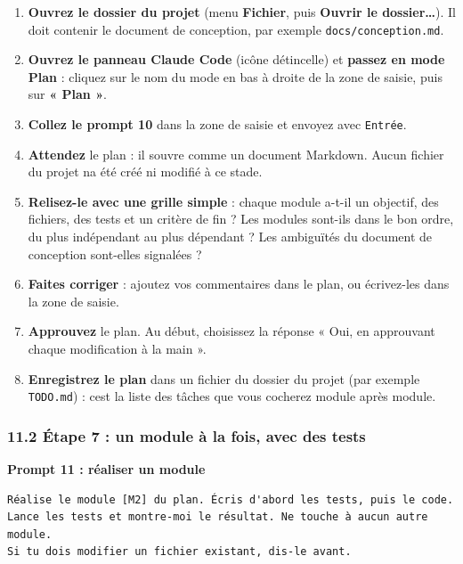 \documentclass[
  french,
  11pt,
  a4paper,
]{article}
\providecommand{\tightlist}{%
  \setlength{\itemsep}{0pt}\setlength{\parskip}{0pt}}
\begin{document}
\begin{enumerate}
\def\labelenumi{\arabic{enumi}.}
\tightlist
\item
  \textbf{Ouvrez le dossier du projet} (menu \textbf{Fichier}, puis
  \textbf{Ouvrir le dossier\ldots{}}). Il doit contenir le document de
  conception, par exemple
  \texttt{docs/\allowbreak{}conception.\allowbreak{}md}.
\item
  \textbf{Ouvrez le panneau Claude Code} (icône
  d\textquotesingle étincelle) et \textbf{passez en mode Plan} : cliquez
  sur le nom du mode en bas à droite de la zone de saisie, puis sur
  \textbf{« Plan »}.
\item
  \textbf{Collez le prompt 10} dans la zone de saisie et envoyez avec
  \texttt{Entrée}.
\item
  \textbf{Attendez} le plan : il s\textquotesingle ouvre comme un
  document Markdown. Aucun fichier du projet n\textquotesingle a été
  créé ni modifié à ce stade.
\item
  \textbf{Relisez-le avec une grille simple} : chaque module a-t-il un
  objectif, des fichiers, des tests et un critère de fin ? Les modules
  sont-ils dans le bon ordre, du plus indépendant au plus dépendant ?
  Les ambiguïtés du document de conception sont-elles signalées ?
\item
  \textbf{Faites corriger} : ajoutez vos commentaires dans le plan, ou
  écrivez-les dans la zone de saisie.
\item
  \textbf{Approuvez} le plan. Au début, choisissez la réponse « Oui, en
  approuvant chaque modification à la main ».
\item
  \textbf{Enregistrez le plan} dans un fichier du dossier du projet (par
  exemple \texttt{TODO.md}) : c\textquotesingle est la liste des tâches
  que vous cocherez module après module.
\end{enumerate}

\subsubsection{11.2 Étape 7 : un module à la fois, avec des
tests}\label{112-uxe9tape-7--un-module-uxe0-la-fois-avec-des-tests}

\textbf{Prompt 11 : réaliser un module}

\begin{Verbatim}[breaklines=true,breakanywhere=true,fontsize=\small,frame=leftline,framerule=1.6pt,rulecolor=\color{credixblue},framesep=3mm,xleftmargin=2mm,xrightmargin=1mm]
Réalise le module [M2] du plan. Écris d'abord les tests, puis le code.
Lance les tests et montre-moi le résultat. Ne touche à aucun autre module.
Si tu dois modifier un fichier existant, dis-le avant.
\end{Verbatim}
\end{document}
